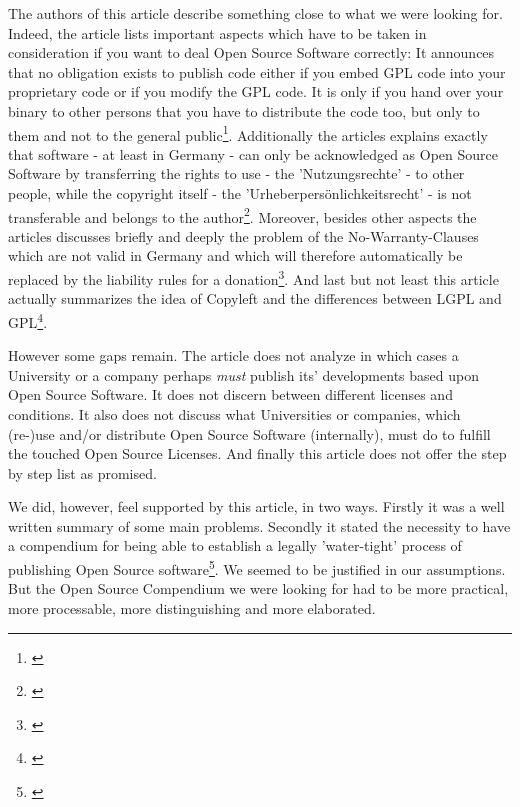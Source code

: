 The authors of this article describe something close to what we were looking
for. Indeed, the article lists important aspects which have to be taken in
consideration if you want to deal Open Source Software correctly: It announces
that no obligation exists to publish code either if you embed GPL code into your
proprietary code or if you modify the GPL code. It is only if you hand over your
binary to other persons that you have to distribute the code too, but only to
them and not to the general public\footnote{\cite[cf.][170 and
181]{BreGlaGra2008a}}. Additionally the articles explains exactly that software
- at least in Germany - can only be acknowledged as Open Source Software by
transferring the rights to use - the 'Nutzungsrechte' - to other people, while
the copyright itself - the 'Urheberpersönlichkeitsrecht' - is not transferable
and belongs to the author\footnote{\cite[cf.][173]{BreGlaGra2008a}}. Moreover,
besides other aspects the articles discusses briefly and deeply the problem of
the No-Warranty-Clauses which are not valid in Germany and which will therefore
automatically be replaced by the liability rules for a
donation\footnote{\cite[cf.][177]{BreGlaGra2008a}}. And last but not least this
article actually summarizes the idea of Copyleft and the differences between
LGPL and GPL\footnote{\cite[cf.][181]{BreGlaGra2008a}}.

However some gaps remain. The article does not analyze in which cases a
University or a company perhaps \emph{must} publish its' developments based
upon Open Source Software. It does not discern between different licenses
and conditions. It also does not discuss what Universities or companies,
which (re-)use and/or distribute Open Source Software (internally), must do to
fulfill the touched Open Source Licenses. And finally this article
does not offer the step by step list as promised.

We did, however, feel supported by this article, in two ways. Firstly it was a
well written summary of some main problems. Secondly it stated the necessity to
have a compendium for being able to establish a legally 'water-tight' process of
publishing Open Source software\footnote{\cite[cf.][186]{BreGlaGra2008a}}. We
seemed to be justified in our assumptions. But the Open Source Compendium we
were looking for had to be more practical, more processable, more distinguishing
and more elaborated.

%
